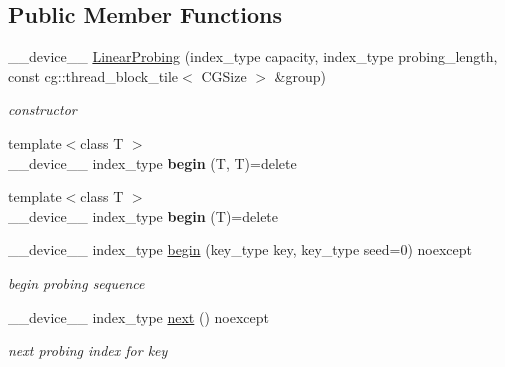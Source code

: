 \subsection*{Public Member Functions}
\begin{DoxyCompactItemize}
\item 
\+\_\+\+\_\+device\+\_\+\+\_\+ \hyperlink{classwarpcore_1_1probing__schemes_1_1LinearProbing_affe37a488156f6a5f971e898034fa99d}{Linear\+Probing} (index\+\_\+type capacity, index\+\_\+type probing\+\_\+length, const cg\+::thread\+\_\+block\+\_\+tile$<$ C\+G\+Size $>$ \&group)
\begin{DoxyCompactList}\small\item\em constructor \end{DoxyCompactList}\item 
\mbox{\label{classwarpcore_1_1probing__schemes_1_1LinearProbing_af0d6aefabf0469b1b8040733c3897b1f}} 
{\footnotesize template$<$class T $>$ }\\\+\_\+\+\_\+device\+\_\+\+\_\+ index\+\_\+type {\bfseries begin} (T, T)=delete
\item 
\mbox{\label{classwarpcore_1_1probing__schemes_1_1LinearProbing_a658f40cbe87eebcc7f8a9cfc907d689c}} 
{\footnotesize template$<$class T $>$ }\\\+\_\+\+\_\+device\+\_\+\+\_\+ index\+\_\+type {\bfseries begin} (T)=delete
\item 
\+\_\+\+\_\+device\+\_\+\+\_\+ index\+\_\+type \hyperlink{classwarpcore_1_1probing__schemes_1_1LinearProbing_a9ab68e3bcbbdd3ea030e2204f9b96b41}{begin} (key\+\_\+type key, key\+\_\+type seed=0) noexcept
\begin{DoxyCompactList}\small\item\em begin probing sequence \end{DoxyCompactList}\item 
\+\_\+\+\_\+device\+\_\+\+\_\+ index\+\_\+type \hyperlink{classwarpcore_1_1probing__schemes_1_1LinearProbing_ad984d7ad47f44ada91df47f135473176}{next} () noexcept
\begin{DoxyCompactList}\small\item\em next probing index for {\ttfamily key} \end{DoxyCompactList}\end{DoxyCompactItemize}
